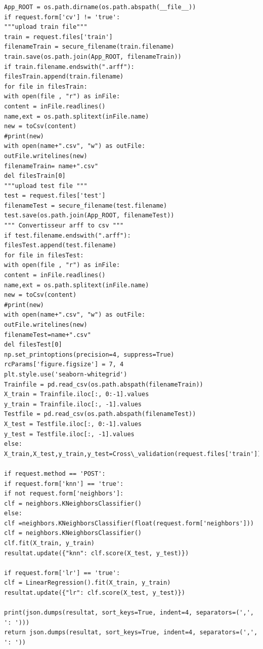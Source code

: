 \documentclass[a4paper,11pt]{article}
\begin{document}
\begin{itemize}
\begin{verbatim}
App_ROOT = os.path.dirname(os.path.abspath(__file__))
if request.form['cv'] != 'true':
"""upload train file"""
train = request.files['train']
filenameTrain = secure_filename(train.filename)
train.save(os.path.join(App_ROOT, filenameTrain))
if train.filename.endswith(".arff"):
filesTrain.append(train.filename)
for file in filesTrain:
with open(file , "r") as inFile:
content = inFile.readlines()
name,ext = os.path.splitext(inFile.name)
new = toCsv(content)
#print(new)
with open(name+".csv", "w") as outFile:
outFile.writelines(new)
filenameTrain= name+".csv"
del filesTrain[0]
"""upload test file """
test = request.files['test']
filenameTest = secure_filename(test.filename)
test.save(os.path.join(App_ROOT, filenameTest))
""" Convertisseur arff to csv """
if test.filename.endswith(".arff"):
filesTest.append(test.filename)
for file in filesTest:
with open(file , "r") as inFile:
content = inFile.readlines()
name,ext = os.path.splitext(inFile.name)
new = toCsv(content)
#print(new)
with open(name+".csv", "w") as outFile:
outFile.writelines(new)
filenameTest=name+".csv"
del filesTest[0]
np.set_printoptions(precision=4, suppress=True)
rcParams['figure.figsize'] = 7, 4
plt.style.use('seaborn-whitegrid')
Trainfile = pd.read_csv(os.path.abspath(filenameTrain))
X_train = Trainfile.iloc[:, 0:-1].values
y_train = Trainfile.iloc[:, -1].values
Testfile = pd.read_csv(os.path.abspath(filenameTest))
X_test = Testfile.iloc[:, 0:-1].values
y_test = Testfile.iloc[:, -1].values
else:
X_train,X_test,y_train,y_test=Cross\_validation(request.files['train'])

if request.method == 'POST':
if request.form['knn'] == 'true':
if not request.form['neighbors']:
clf = neighbors.KNeighborsClassifier()
else:
clf =neighbors.KNeighborsClassifier(float(request.form['neighbors']))
clf = neighbors.KNeighborsClassifier()
clf.fit(X_train, y_train)
resultat.update({"knn": clf.score(X_test, y_test)})

if request.form['lr'] == 'true':
clf = LinearRegression().fit(X_train, y_train)
resultat.update({"lr": clf.score(X_test, y_test)})

print(json.dumps(resultat, sort_keys=True, indent=4, separators=(',', ': ')))
return json.dumps(resultat, sort_keys=True, indent=4, separators=(',', ': '))



\end{verbatim}
\end{itemize}
\end{document}
